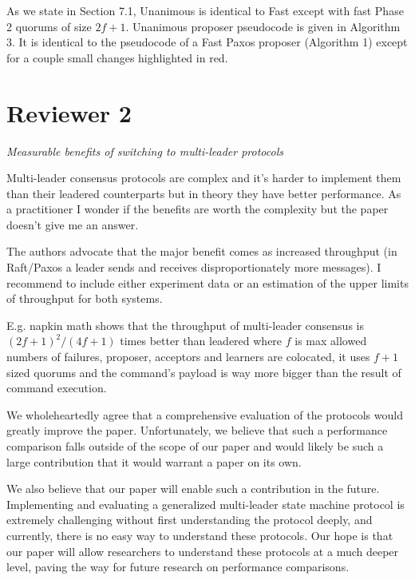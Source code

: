 \documentclass[letterpaper,twocolumn,10pt]{article}
\newenvironment{reviewerquote}
{\list{}{\leftmargin=\parindent\rightmargin=0in}\item[] \itshape \color{ReviewerDarkGray}}%
{\endlist}
\begin{document}
As we state in Section 7.1, Unanimous \BPaxos{} is identical to Fast \BPaxos{}
except with fast Phase 2 quorums of size $2f+1$. Unanimous \BPaxos{} proposer
pseudocode is given in Algorithm 3. It is identical to the pseudocode of a Fast
Paxos proposer (Algorithm 1) except for a couple small changes highlighted in
red.

\section*{Reviewer 2}
\begin{reviewerquote}
  Measurable benefits of switching to multi-leader protocols

  Multi-leader consensus protocols are complex and it's harder to implement
  them than their leadered counterparts but in theory they have better
  performance. As a practitioner I wonder if the benefits are worth the
  complexity but the paper doesn't give me an answer.

  The authors advocate that the major benefit comes as increased throughput (in
  Raft/Paxos a leader sends and receives disproportionately more messages). I
  recommend to include either experiment data or an estimation of the upper
  limits of throughput for both systems.

  E.g. napkin math shows that the throughput of multi-leader consensus is
  $(2f+1)^2/(4f+1)$ times better than leadered where $f$ is max allowed numbers
  of failures, proposer, acceptors and learners are colocated, it uses $f+1$
  sized quorums and the command's payload is way more bigger than the result of
  command execution.
\end{reviewerquote}

We wholeheartedly agree that a comprehensive evaluation of the protocols would
greatly improve the paper. Unfortunately, we believe that such a performance
comparison falls outside of the scope of our paper and would likely be such a
large contribution that it would warrant a paper on its own.

We also believe that our paper will enable such a contribution in the future.
Implementing and evaluating a generalized multi-leader state machine protocol
is extremely challenging without first understanding the protocol deeply, and
currently, there is no easy way to understand these protocols. Our hope is that
our paper will allow researchers to understand these protocols at a much deeper
level, paving the way for future research on performance comparisons.
\end{document}
